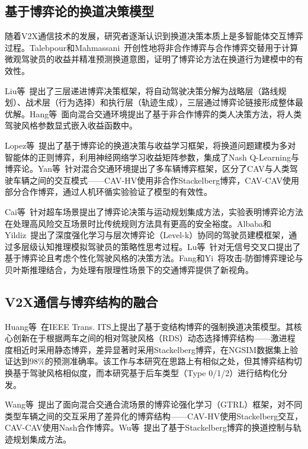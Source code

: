 \subsection{基于博弈论的换道决策模型}
随着V2X通信技术的发展，研究者逐渐认识到换道决策本质上是多智能体交互博弈过程。Talebpour和Mahmassani~\cite{talebpour2016influence}开创性地将非合作博弈与合作博弈交替用于计算微观驾驶员的收益并精准预测换道意图，证明了博弈论方法在换道行为建模中的有效性。

Liu等~\cite{liu2022three}提出了三层递进博弈决策框架，将自动驾驶决策分解为战略层（路线规划）、战术层（行为选择）和执行层（轨迹生成），三层通过博弈论链接形成整体最优解。Hang等~\cite{hang2021human}面向混合交通环境提出了基于非合作博弈的类人决策方法，将人类驾驶风格参数显式嵌入收益函数中。

Lopez等~\cite{lopez2022game}提出了基于博弈论的换道决策与收益学习框架，将换道问题建模为多对智能体的正则博弈，利用神经网络学习收益矩阵参数，集成了Nash Q-Learning与博弈论。Yan等~\cite{yan2023multi}针对混合交通环境提出了多车辆博弈框架，区分了CAV与人类驾驶车辆之间的交互模式——CAV-HV使用非合作Stackelberg博弈，CAV-CAV使用部分合作博弈，通过人机环循实验验证了模型的有效性。

Cai等~\cite{cai2024game}针对超车场景提出了博弈论决策与运动规划集成方法，实验表明博弈论方法在处理高风险交互场景时比传统规则方法具有更高的安全裕度。Albaba和Yildiz~\cite{albaba2022driver}提出了深度强化学习与层次博弈论（Level-k）协同的驾驶员建模框架，通过多层级认知推理模拟驾驶员的策略性思考过程。Lu等~\cite{lu2023game}针对无信号交叉口提出了基于博弈论且考虑个性化驾驶风格的决策方法。Fang和Yi~\cite{fang2024adaptive}将攻击-防御博弈理论与贝叶斯推理结合，为处理有限理性场景下的交通博弈提供了新视角。

\subsection{V2X通信与博弈结构的融合}
Huang等~\cite{huang2024game}在IEEE Trans. ITS上提出了基于变结构博弈的强制换道决策模型。其核心创新在于根据两车之间的相对驾驶风格（RDS）动态选择博弈结构——激进程度相近时采用静态博弈，差异显著时采用Stackelberg博弈，在NGSIM数据集上验证达到98\%的预测准确率。该工作与本研究在思路上有相似之处，但其博弈结构切换基于驾驶风格相似度，而本研究基于后车类型（Type 0/1/2）进行结构化分发。

Wang等~\cite{wang2026game}提出了面向混合交通合流场景的博弈论强化学习（GTRL）框架，对不同类型车辆之间的交互采用了差异化的博弈结构——CAV-HV使用Stackelberg交互，CAV-CAV使用Nash合作博弈。Wu等~\cite{wu2024lane}提出了基于Stackelberg博弈的换道控制与轨迹规划集成方法。

